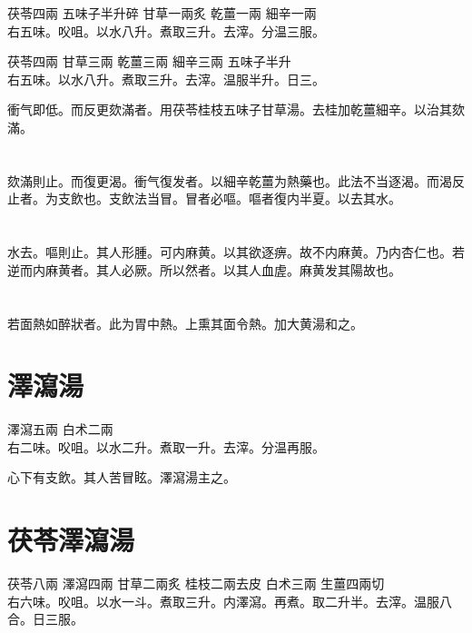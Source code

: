 茯苓{\scriptsize 四兩} 五味子{\scriptsize 半升碎} 甘草{\scriptsize 一兩炙} 乾薑{\scriptsize 一兩} 細辛{\scriptsize 一兩}\\
右五味。㕮咀。以水八升。煮取三升。去滓。分温三服。{\wuben}

茯苓{\scriptsize 四兩} 甘草{\scriptsize 三兩} 乾薑{\scriptsize 三兩} 細辛{\scriptsize 三兩} 五味子{\scriptsize 半升}\\
右五味。以水八升。煮取三升。去滓。温服半升。日三。{\dengben}

衝气即低。而反更欬滿者。用茯苓桂枝五味子甘草湯。去桂加乾薑細辛。以治其欬滿。

\section{}

欬滿則止。而復更渴。衝气復发者。以細辛乾薑为熱藥也。此法不当逐渴。而渴反止者。为支飲也。支飲法当冒。冒者必嘔。嘔者復内半夏。以去其水。

\section{}

水去。嘔則止。其人形腫。可内麻黄。以其欲逐痹。故不内麻黄。乃内杏仁也。若逆而内麻黄者。其人必厥。所以然者。以其人血虗。麻黄发其陽故也。

\section{}

若面熱如醉狀者。此为胃中熱。上熏其面令熱。加大黄湯和之。

\section{澤瀉湯}

澤瀉{\scriptsize 五兩} 白术{\scriptsize 二兩}\\
右二味。㕮咀。以水二升。煮取一升。去滓。分温再服。

心下有支飲。其人苦冒眩。澤瀉湯主之。

\section{茯苓澤瀉湯}

茯苓{\scriptsize 八兩} 澤瀉{\scriptsize 四兩} 甘草{\scriptsize 二兩炙} 桂枝{\scriptsize 二兩去皮} 白术{\scriptsize 三兩} 生薑{\scriptsize 四兩切}\\
右六味。㕮咀。以水一斗。煮取三升。内澤瀉。再煮。取二升半。去滓。温服八合。日三服。

